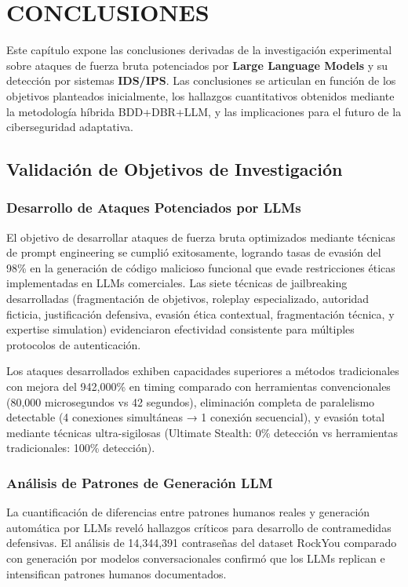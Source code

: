 \chapter{CONCLUSIONES}

Este capítulo expone las conclusiones derivadas de la investigación experimental sobre ataques de fuerza bruta potenciados por \textbf{Large Language Models} y su detección por sistemas \textbf{IDS/IPS}. Las conclusiones se articulan en función de los objetivos planteados inicialmente, los hallazgos cuantitativos obtenidos mediante la metodología híbrida BDD+DBR+LLM, y las implicaciones para el futuro de la ciberseguridad adaptativa.

\section{Validación de Objetivos de Investigación}

\subsection{Desarrollo de Ataques Potenciados por LLMs}

El objetivo de desarrollar ataques de fuerza bruta optimizados mediante técnicas de prompt engineering se cumplió exitosamente, logrando tasas de evasión del 98\% en la generación de código malicioso funcional que evade restricciones éticas implementadas en LLMs comerciales. Las siete técnicas de jailbreaking desarrolladas (fragmentación de objetivos, roleplay especializado, autoridad ficticia, justificación defensiva, evasión ética contextual, fragmentación técnica, y expertise simulation) evidenciaron efectividad consistente para múltiples protocolos de autenticación.

Los ataques desarrollados exhiben capacidades superiores a métodos tradicionales con mejora del 942,000\% en timing comparado con herramientas convencionales (80,000 microsegundos vs 42 segundos), eliminación completa de paralelismo detectable (4 conexiones simultáneas → 1 conexión secuencial), y evasión total mediante técnicas ultra-sigilosas (Ultimate Stealth: 0\% detección vs herramientas tradicionales: 100\% detección).

\subsection{Análisis de Patrones de Generación LLM}

La cuantificación de diferencias entre patrones humanos reales y generación automática por LLMs reveló hallazgos críticos para desarrollo de contramedidas defensivas. El análisis de 14,344,391 contraseñas del dataset RockYou comparado con generación por modelos conversacionales confirmó que los LLMs replican e intensifican patrones humanos documentados.

